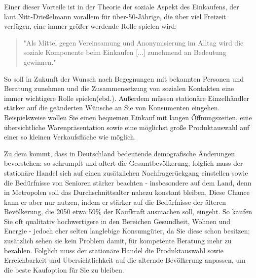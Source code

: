 \begin{folding}
Einer dieser Vorteile ist in der Theorie der soziale Aspekt des Einkaufens, der laut Nitt-Drießelmann vorallem für über-50-Jährige, die über viel Freizeit verfügen, eine immer größer werdende Rolle spielen wird\cite[S. 43f]{Nitt}:
\begin{quote}
"Als Mittel gegen Vereinsamung und Anonymisierung im Alltag wird die soziale Komponente beim Einkaufen [...] zunehmend an Bedeutung gewinnen."\cite[S. 43]{Nitt}
\end{quote} 
So soll in Zukunft der Wunsch nach Begegnungen mit bekannten Personen und Beratung zunehmen und die Zusammensetzung von sozialen Kontakten eine immer wichtigere Rolle spielen(ebd.).
Außerdem müssen stationäre Einzelhändler stärker auf die geänderten Wünsche an Sie von Konsumenten eingehen. Beispielsweise wollen Sie einen bequemen Einkauf mit langen Öffnungszeiten, eine übersichtliche Warenpräsentation sowie eine möglichst große Produktauswahl auf einer so kleinen Verkaufsfläche wie möglich\cite[S. 61]{Nitt}.

Zu dem kommt, dass in Deutschland bedeutende demografische Änderungen bevorstehen: so schrumpft und altert die Gesamtbevölkerung, folglich muss der stationäre Handel sich auf einen zusätzlichen Nachfragerückgang einstellen sowie die Bedürfnisse von Senioren stärker beachten - insbesondere auf dem Land, denn in Metropolen soll das Durchschnittsalter nahezu konstant bleiben\cite[S. 32ff]{Nitt}. Diese Chance kann er aber nur nutzen, indem er stärker auf die Bedürfnisse der älteren Bevölkerung, die 2050 etwa 59\% der Kaufkraft ausmachen soll, eingeht\cite[S. 64]{Nitt}. So kaufen Sie oft qualitativ hochwertigere in den Bereichen Gesundheit, Wohnen und Energie - jedoch eher selten langlebige Konsumgüter, da Sie diese schon besitzen; zusätzlich sehen sie kein Problem damit, für kompetente Beratung mehr zu bezahlen\cite[S. 41f]{Nitt}. Folglich muss der stationäre Handel die Produktauswahl sowie Erreichbarkeit und Übersichtlichkeit auf die alternde Bevölkerung anpassen, um die beste Kaufoption für Sie zu bleiben\cite[S. 64]{Nitt}.


\end{folding}
